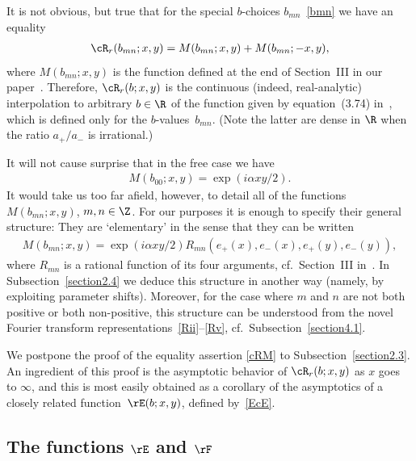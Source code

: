 \documentclass[pdftex]{sigma}
\numberwithin{equation}{section}
\begin{document}
It is not obvious, but true that for the special $b$-choices $b_{mn}$~\eqref{bmn}
we have an equality
\begin{gather}\label{cRM}
\cR_r(b_{mn};x,y)=M(b_{mn};x,y)+M(b_{mn};-x,y),
\end{gather}
where $M(b_{mn};x,y)$ is the function def\/ined at the end of Section~III in our paper~\cite{GLFII}. Therefore, $\cR_r(b;x,y)$ is the continuous (indeed, real-analytic) interpolation to arbitrary $b\in\R$ of  the function given by equation~(3.74) in~\cite{GLFII}, which is def\/ined only for the $b$-values~$b_{mn}$. (Note the latter are dense in $\R$ when the ratio $a_{+}/a_{-}$ is irrational.)

It will not cause surprise that in the free case we have
\begin{gather}\label{M00}
M(b_{00};x,y)=\exp(i\alpha xy/2).
\end{gather}
It would take us too far af\/ield, however, to detail all of the functions $M(b_{mn};x,y)$, $m,n\in\Z$. For our purposes it is enough to specify their general structure: They are `elementary' in the sense that they can be written
\begin{gather}\label{Mform}
M(b_{mn};x,y)=\exp(i\alpha xy/2)R_{mn}(e_{+}(x),e_{-}(x),e_{+}(y),e_{-}(y)),
\end{gather}
where $R_{mn}$ is a rational function of its four arguments, cf.~Section~III in~\cite{GLFII}. In Subsection~\ref{section2.4} we deduce this structure in another way (namely, by exploiting parameter shifts). Moreover, for the case where $m$ and $n$ are not both positive or both non-positive, this structure can be understood from the novel Fourier transform representations~\eqref{Rii}--\eqref{Rv}, cf.~Subsection~\ref{section4.1}.

We postpone the proof of the equality assertion \eqref{cRM} to Subsection~\ref{section2.3}. An ingredient of this proof is the asymptotic behavior of $\cR_r(b;x,y)$ as $x$ goes to $\infty$, and this is most easily obtained as a corollary of the asymptotics of a closely related function~$\rE(b;x,y)$, def\/ined by~\eqref{EcE}.

\subsection[The functions $\rE$ and $\rF$]{The functions $\boldsymbol{\rE}$ and $\boldsymbol{\rF}$}\label{section2.2}
\end{document}
